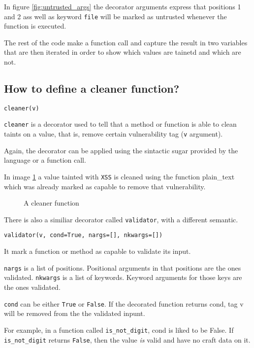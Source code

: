 In figure \ref{fig:untrusted_args} the decorator arguments express that positions 1 and 2 ass well
as keyword \texttt{file} will be marked as untrusted whenever the function is executed.

The rest of the code make a function call and capture the result in two variables that are then iterated
in order to show which values are tainetd and which are not. 

\subsection*{How to define a cleaner function?}

\texttt{cleaner(v)}

\texttt{cleaner} is a decorator used to tell that a method or function is able to clean
taints on a value, that is, remove certain vulnerability tag (\texttt{v} argument).

Again, the decorator can be applied using the sintactic sugar provided by the
language or a function call.

In image \ref{fig:cleaner1} a value tainted with \texttt{XSS} is cleaned using
the function plain\_text which was already marked as capable to remove that vulnerability.

\begin{figure}[t]
{\small{
\begin{minipage}[t]{0.5\linewidth}
 
\end{minipage}
\caption{\label{fig:cleaner1}A cleaner function}
}}
\end{figure}

There is also a similiar decorator called \texttt{validator}, with a different semantic.

\texttt{validator(v, cond=True, nargs=[], nkwargs=[])}

It mark a function or method as capable to validate its input.

\texttt{nargs} is a list of positions. Positional arguments in that positions are
the ones validated.
\texttt{nkwargs} is a list of keywords. Keyword arguments for those keys are the ones
validated.

\texttt{cond} can be either \texttt{True} or \texttt{False}.
If the decorated function returns cond, tag v will be removed from the the validated
inpunt.

For example, in a function called \texttt{is\_not\_digit}, cond is liked to be False. If
\texttt{is\_not\_digit} returns \texttt{False}, then the value \emph{is} valid and have no craft data
on it. 


